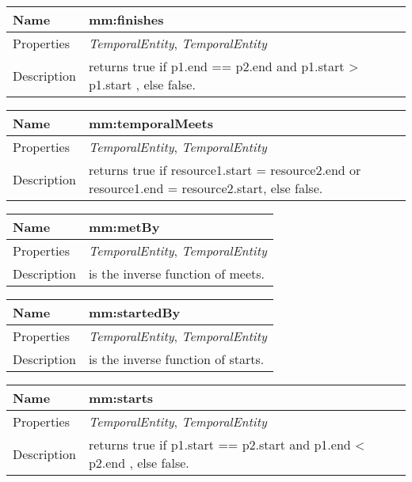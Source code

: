 \vspace{0.3cm}
\newline
\begin{tabular}{|p{3cm}|p{10cm}|}
\hline Name & mm:finishes\\
\hline Properties & \textit{TemporalEntity}, \textit{TemporalEntity} \\
\hline Description & returns true if p1.end == p2.end and p1.start > p1.start , else false.\\
\hline
\end{tabular}
\vspace{0.3cm}
\newline
\begin{tabular}{|p{3cm}|p{10cm}|}
\hline Name & mm:temporalMeets\\
\hline Properties & \textit{TemporalEntity}, \textit{TemporalEntity} \\
\hline Description & returns true if resource1.start = resource2.end or resource1.end = resource2.start, else false.\\
\hline
\end{tabular}
\vspace{0.3cm}
\newline
\begin{tabular}{|p{3cm}|p{10cm}|}
\hline Name & mm:metBy\\
\hline Properties & \textit{TemporalEntity}, \textit{TemporalEntity} \\
\hline Description & is the inverse function of meets.\\
\hline
\end{tabular}
\vspace{0.3cm}
\newline
\begin{tabular}{|p{3cm}|p{10cm}|}
\hline Name & mm:startedBy\\
\hline Properties & \textit{TemporalEntity}, \textit{TemporalEntity} \\
\hline Description & is the inverse function of starts.\\
\hline
\end{tabular}
\vspace{0.3cm}
\newline
\begin{tabular}{|p{3cm}|p{10cm}|}
\hline Name & mm:starts\\
\hline Properties & \textit{TemporalEntity}, \textit{TemporalEntity} \\
\hline Description & returns true if p1.start == p2.start and p1.end < p2.end , else false.\\
\hline
\end{tabular}

